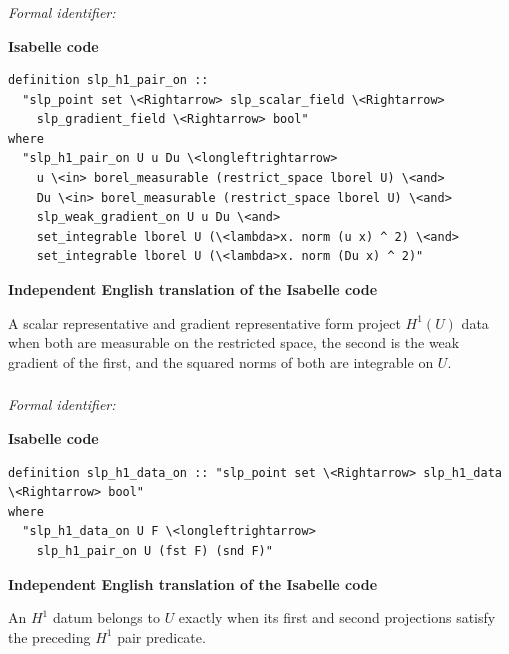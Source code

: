 \documentclass[10pt,oneside]{article}
\newcommand{\reviewlabel}[1]{\par\smallskip\noindent\textsf{\bfseries #1}\par\smallskip}
\begin{document}
\subsubsection{\texttt{}}
\noindent\textit{Formal identifier:} \texttt{}

\reviewlabel{Isabelle code}
\begin{lstlisting}
definition slp_h1_pair_on ::
  "slp_point set \<Rightarrow> slp_scalar_field \<Rightarrow>
    slp_gradient_field \<Rightarrow> bool"
where
  "slp_h1_pair_on U u Du \<longleftrightarrow>
    u \<in> borel_measurable (restrict_space lborel U) \<and>
    Du \<in> borel_measurable (restrict_space lborel U) \<and>
    slp_weak_gradient_on U u Du \<and>
    set_integrable lborel U (\<lambda>x. norm (u x) ^ 2) \<and>
    set_integrable lborel U (\<lambda>x. norm (Du x) ^ 2)"
\end{lstlisting}

\reviewlabel{Independent English translation of the Isabelle code}
A scalar representative and gradient representative form project $H^1(U)$ data when both are measurable on the restricted space, the second is the weak gradient of the first, and the squared norms of both are integrable on $U$.

\subsubsection{\texttt{}}
\noindent\textit{Formal identifier:} \texttt{}

\reviewlabel{Isabelle code}
\begin{lstlisting}
definition slp_h1_data_on :: "slp_point set \<Rightarrow> slp_h1_data \<Rightarrow> bool"
where
  "slp_h1_data_on U F \<longleftrightarrow>
    slp_h1_pair_on U (fst F) (snd F)"
\end{lstlisting}

\reviewlabel{Independent English translation of the Isabelle code}
An $H^1$ datum belongs to $U$ exactly when its first and second projections satisfy the preceding $H^1$ pair predicate.
\end{document}
